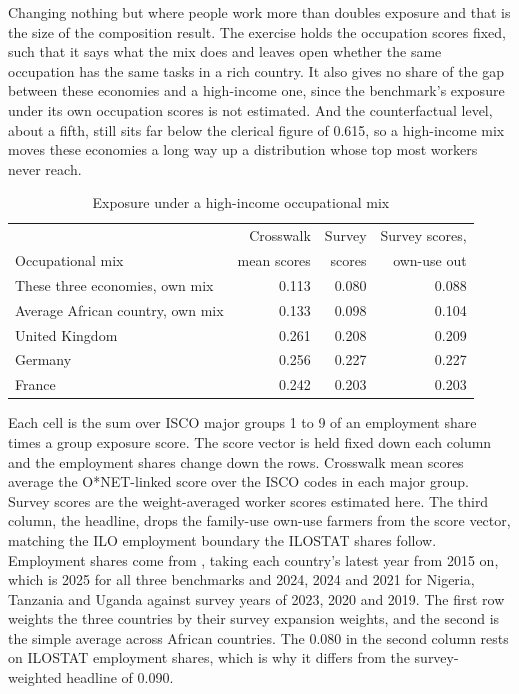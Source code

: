 Changing nothing but where people work more than doubles exposure and that is the
size of the composition result.
The exercise holds the occupation scores fixed, such that it says what the mix does and
leaves open whether the same occupation has the same tasks in a rich
country. It also gives no share of the gap between these economies and a
high-income one, since the benchmark's exposure under its own occupation scores
is not estimated. And the
counterfactual level, about a fifth, still sits far below the clerical figure of
0.615, so a high-income mix moves these economies a long way up a distribution
whose top most workers never reach.

\begin{table}[ht]
\centering
\caption{Exposure under a high-income occupational mix}
\label{tab:composition}
\small
\begin{tabular}{lrrr}
\toprule
 & Crosswalk & Survey & Survey scores, \\
Occupational mix & mean scores & scores & own-use out \\
\midrule
These three economies, own mix   & 0.113 & 0.080 & 0.088 \\
Average African country, own mix & 0.133 & 0.098 & 0.104 \\
\midrule
United Kingdom                   & 0.261 & 0.208 & 0.209 \\
Germany                          & 0.256 & 0.227 & 0.227 \\
France                           & 0.242 & 0.203 & 0.203 \\
\bottomrule
\end{tabular}

\vspace{4pt}
\begin{minipage}{0.94\linewidth}
\footnotesize
Each cell is the sum over ISCO major groups 1 to 9 of an employment share times
a group exposure score. The score vector is held fixed down each column and the
employment shares change down the rows. Crosswalk mean scores average the
O*NET-linked score over the ISCO codes in each major group. Survey scores are
the weight-averaged worker scores estimated here. The third column, the
headline, drops the family-use own-use farmers from the score vector, matching
the ILO employment boundary the ILOSTAT shares follow. Employment shares come from
\citet{ilostat}, taking each country's latest year from 2015 on, which is 2025
for all three benchmarks and 2024, 2024 and 2021 for Nigeria, Tanzania and
Uganda against survey years of 2023, 2020 and 2019. The first row weights the
three countries by their survey expansion weights, and the second is the simple
average across African countries. The 0.080 in the second column rests on ILOSTAT
employment shares, which is why it differs from the survey-weighted headline of
0.090.
\end{minipage}
\end{table}


